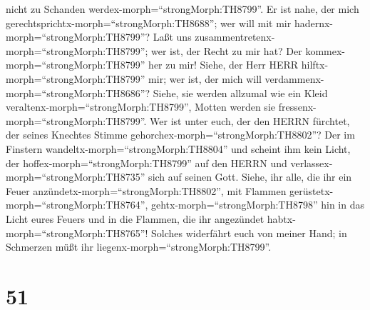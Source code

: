 nicht zu Schanden werdex-morph=``strongMorph:TH8799''.  Er
ist nahe, der mich gerechtsprichtx-morph=``strongMorph:TH8688''; wer
will mit mir hadernx-morph=``strongMorph:TH8799''? Laßt uns
zusammentretenx-morph=``strongMorph:TH8799''; wer ist, der Recht zu mir
hat? Der kommex-morph=``strongMorph:TH8799'' her zu mir! 
Siehe, der Herr HERR hilftx-morph=``strongMorph:TH8799'' mir; wer ist,
der mich will verdammenx-morph=``strongMorph:TH8686''? Siehe, sie werden
allzumal wie ein Kleid veraltenx-morph=``strongMorph:TH8799'', Motten
werden sie fressenx-morph=``strongMorph:TH8799''.  Wer ist
unter euch, der den HERRN fürchtet, der seines Knechtes Stimme
gehorchex-morph=``strongMorph:TH8802''? Der im Finstern
wandeltx-morph=``strongMorph:TH8804'' und scheint ihm kein Licht, der
hoffex-morph=``strongMorph:TH8799'' auf den HERRN und
verlassex-morph=``strongMorph:TH8735'' sich auf seinen Gott.
 Siehe, ihr alle, die ihr ein Feuer
anzündetx-morph=``strongMorph:TH8802'', mit Flammen
gerüstetx-morph=``strongMorph:TH8764'',
gehtx-morph=``strongMorph:TH8798'' hin in das Licht eures Feuers und in
die Flammen, die ihr angezündet habtx-morph=``strongMorph:TH8765''!
Solches widerfährt euch von meiner Hand; in Schmerzen müßt ihr
liegenx-morph=``strongMorph:TH8799''.

\hypertarget{section-50}{%
\section{51}\label{section-50}}

